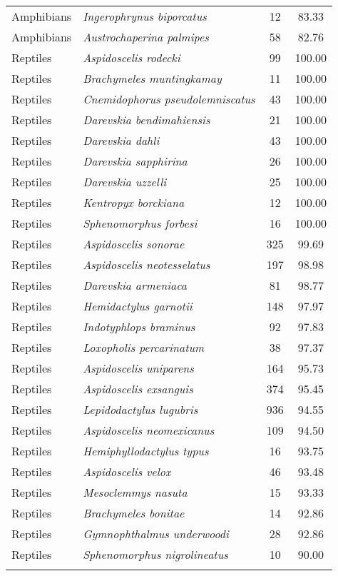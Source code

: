 \begin{longtable}{l>{\itshape}lcc}
  Amphibians & Ingerophrynus biporcatus &  12 & 83.33 \\ 
  Amphibians & Austrochaperina palmipes &  58 & 82.76 \\ 
  Reptiles & Aspidoscelis rodecki &  99 & 100.00 \\ 
  Reptiles & Brachymeles muntingkamay &  11 & 100.00 \\ 
  Reptiles & Cnemidophorus pseudolemniscatus &  43 & 100.00 \\ 
  Reptiles & Darevskia bendimahiensis &  21 & 100.00 \\ 
  Reptiles & Darevskia dahli &  43 & 100.00 \\ 
  Reptiles & Darevskia sapphirina &  26 & 100.00 \\ 
  Reptiles & Darevskia uzzelli &  25 & 100.00 \\ 
  Reptiles & Kentropyx borckiana &  12 & 100.00 \\ 
  Reptiles & Sphenomorphus forbesi &  16 & 100.00 \\ 
  Reptiles & Aspidoscelis sonorae & 325 & 99.69 \\ 
  Reptiles & Aspidoscelis neotesselatus & 197 & 98.98 \\ 
  Reptiles & Darevskia armeniaca &  81 & 98.77 \\ 
  Reptiles & Hemidactylus garnotii & 148 & 97.97 \\ 
  Reptiles & Indotyphlops braminus &  92 & 97.83 \\ 
  Reptiles & Loxopholis percarinatum &  38 & 97.37 \\ 
  Reptiles & Aspidoscelis uniparens & 164 & 95.73 \\ 
  Reptiles & Aspidoscelis exsanguis & 374 & 95.45 \\ 
  Reptiles & Lepidodactylus lugubris & 936 & 94.55 \\ 
  Reptiles & Aspidoscelis neomexicanus & 109 & 94.50 \\ 
  Reptiles & Hemiphyllodactylus typus &  16 & 93.75 \\ 
  Reptiles & Aspidoscelis velox &  46 & 93.48 \\ 
  Reptiles & Mesoclemmys nasuta &  15 & 93.33 \\ 
  Reptiles & Brachymeles bonitae &  14 & 92.86 \\ 
  Reptiles & Gymnophthalmus underwoodi &  28 & 92.86 \\ 
  Reptiles & Sphenomorphus nigrolineatus &  10 & 90.00 \\ 
   \hline
\label{table_best}
\end{longtable}
